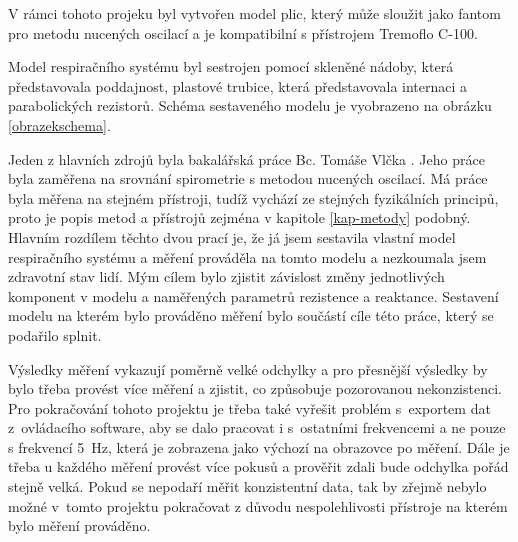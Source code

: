 V rámci tohoto projeku byl vytvořen model plic, který může sloužit jako fantom pro metodu nucených oscilací a je kompatibilní s přístrojem Tremoflo C-100. 

Model respiračního systému byl sestrojen pomocí skleněné nádoby, která představovala poddajnost, plastové trubice, která představovala internaci a parabolických rezistorů.  Schéma sestaveného modelu je vyobrazeno na obrázku \ref{obrazekschema}. 

Jeden z hlavních zdrojů byla bakalářská práce Bc. Tomáše Vlčka \cite{Vlcek2018}. Jeho práce byla zaměřena na srovnání spirometrie s metodou nucených oscilací. Má práce byla měřena na stejném přístroji, tudíž vychází ze stejných fyzikálních principů, proto je popis metod a přístrojů zejména v kapitole \ref{kap-metody} podobný. Hlavním rozdílem těchto dvou prací je, že já jsem sestavila vlastní model respiračního systému a měření prováděla na tomto modelu a nezkoumala jsem zdravotní stav lidí. Mým cílem bylo zjistit závislost změny jednotlivých komponent v modelu a naměřených parametrů rezistence a reaktance. Sestavení modelu na kterém bylo prováděno měření bylo součástí cíle této práce, který se podařilo splnit. 

Výsledky měření vykazují poměrně velké odchylky a pro přesnější výsledky by bylo třeba provést více měření a zjistit, co způsobuje pozorovanou nekonzistenci. Pro pokračování tohoto projektu je třeba také vyřešit problém s~exportem dat z~ovládacího software, aby se dalo pracovat i s~ostatními frekvencemi a ne pouze s frekvencí \SI{5}{Hz}, která je zobrazena jako výchozí na obrazovce po měření. Dále je třeba u každého měření provést více pokusů a prověřit zdali bude odchylka pořád stejně velká. 
Pokud se nepodaří měřit konzistentní data, tak by zřejmě nebylo možné v~tomto projektu pokračovat z důvodu nespolehlivosti přístroje na kterém bylo měření prováděno. 
